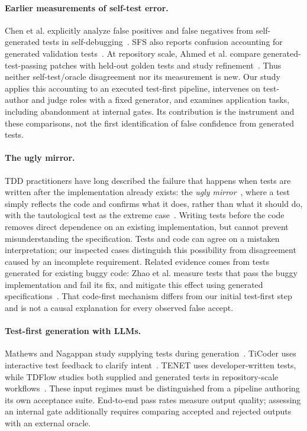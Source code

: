\documentclass{article}
\begin{document}
\paragraph{Earlier measurements of self-test error.}
Chen et al. explicitly analyze false positives and false negatives from self-generated tests
in self-debugging~\cite{chen2025revisit}. SFS also reports confusion accounting for generated
validation tests~\cite{light2025sfs}. At repository scale, Ahmed et al. compare
generated-test-passing patches with held-out golden tests and study refinement~\cite{ahmed2025overfitting}.
Thus neither self-test/oracle disagreement nor its measurement is new. Our study applies
this accounting to an executed test-first pipeline, intervenes on test-author and judge
roles with a fixed generator, and examines application tasks, including abandonment at
internal gates. Its contribution is the instrument and these comparisons, not the first
identification of false confidence from generated tests.

\paragraph{The ugly mirror.}
TDD practitioners have long described the failure that happens when tests are written
after the implementation already exists: the \emph{ugly mirror}~\cite{rudolph2008uglymirror},
where a test simply reflects the code and confirms what it does, rather than what it should do,
with the tautological test as the extreme case~\cite{pereira2010ttdd}. Writing tests before the
code removes direct dependence on an existing implementation, but cannot prevent
misunderstanding the specification. Tests and code can agree on a mistaken interpretation;
our inspected cases distinguish this possibility from disagreement caused by an incomplete
requirement. Related evidence comes from tests generated for existing buggy code:
Zhao et al. measure tests that pass the buggy implementation and fail its fix, and mitigate
this effect using generated specifications~\cite{zhao2026misguidance}. That code-first
mechanism differs from our initial test-first step and is not a causal explanation for
every observed false accept.

\paragraph{Test-first generation with LLMs.}
Mathews and Nagappan study supplying tests during generation~\cite{mathews2024tdd}.
TiCoder uses interactive test feedback to clarify intent~\cite{fakhoury2024ticoder}.
TENET uses developer-written tests, while TDFlow studies both supplied and generated
tests in repository-scale workflows~\cite{sun2025tenet,tdflow2025}. These input regimes
must be distinguished from a pipeline authoring its own acceptance suite. End-to-end
pass rates measure output quality; assessing an internal gate additionally requires
comparing accepted and rejected outputs with an external oracle.
\end{document}
